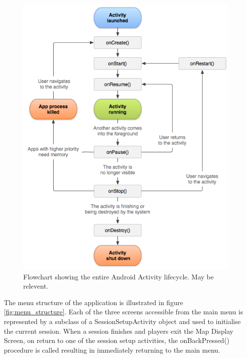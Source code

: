 \begin{figure}[h]
\centering
\includegraphics[scale=0.4]{activity_lifecycle}
\caption{Flowchart showing the entire Android Activity lifecycle. May be relevent.}
\label{fig:activity_lifecycle}
\end{figure}

The menu structure of the application is illustrated in figure \ref{fig:menu_structure}. Each of the three screens accessible from the main menu is represented by a subclass of a SessionSetupActivity object and used to initialise the current session. When a session finishes and players exit the Map Display Screen, on return to one of the session setup activities, the onBackPressed() procedure is called resulting in immediately returning to the main menu.

